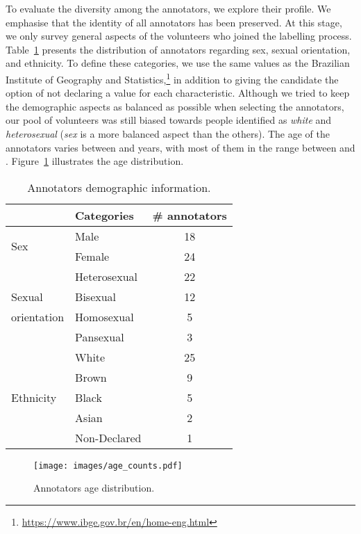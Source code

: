 \documentclass[11pt,a4paper]{article}
\begin{document}
To evaluate the diversity among the annotators, we explore their profile. We emphasise that the identity of all annotators has been preserved. At this stage, we only survey general aspects of the volunteers who joined the labelling process.
Table~\ref{tab:demographics} presents the distribution of annotators regarding sex, sexual orientation, and ethnicity. To define these categories, we use the same values as the Brazilian Institute of Geography and Statistics,\footnote{\url{https://www.ibge.gov.br/en/home-eng.html}} in addition to giving the candidate the option of not declaring a value for each characteristic. Although we tried to keep the demographic aspects as balanced as possible when selecting the annotators, our pool of volunteers was still biased towards people identified as \textit{white} and \textit{heterosexual} (\textit{sex} is a more balanced aspect than the others). The age of the annotators varies between  and  years, with most of them in the range between  and . Figure~\ref{fig:age} illustrates the age distribution.

\begin{table}[ht]
\centering
\setlength{\tabcolsep}{1pt}
\begin{tabular}{p{2cm}lc}
\toprule
& Categories & \# annotators                                                \\ \bottomrule
\multirow{2}{*}{Sex} & Male & 18 \\  
& Female & 24    \\ \midrule

& Heterosexual & 22 \\ 
Sexual & Bisexual & 12 \\ 
orientation & Homosexual & 5 \\ 
& Pansexual &  3\\ \midrule

\multirow{5}{*}{Ethnicity}                                                     & White & 25 \\ 
& Brown & 9 \\ 
& Black & 5 \\ 
& Asian & 2\\ 
& Non-Declared & 1  \\ \bottomrule
\end{tabular}
\caption{Annotators demographic information.}\label{tab:demographics}
\end{table}

\begin{figure}[ht]
\centering
\texttt{[image: images/age\_counts.pdf]}
\caption{Annotators age distribution.}
\label{fig:age}
\end{figure}
\end{document}
